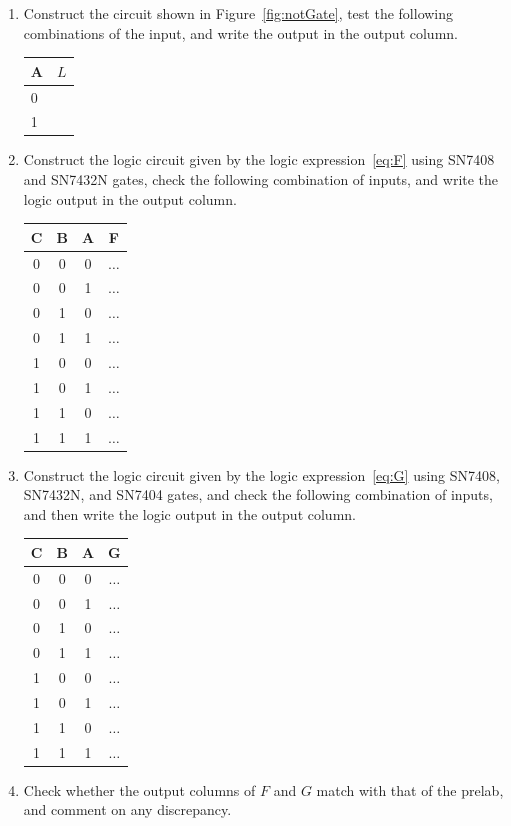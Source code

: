 \begin{enumerate}
\item Construct the circuit shown in Figure~\ref{fig:notGate}, test the following combinations of the input, and write the output in the output column.

  \begin{center}
  \begin{tabular}{l|l}
    \toprule
    A&$L$\\
    \toprule
    0 & \\
    1 & \\    
    \bottomrule
  \end{tabular}      
\end{center}


\item Construct the logic circuit given by the logic expression~\eqref{eq:F} using SN7408 and SN7432N gates, check the following combination of inputs, and write the logic output in the output column.

  \begin{center}
  \begin{tabular}{ccc|c}
    \toprule
    C & B & A & F \\
    \toprule
    0 & 0 & 0 & $\ldots$ \\
    0 & 0 & 1 & $\ldots$ \\
    0 & 1 & 0 & $\ldots$ \\
    0 & 1 & 1 & $\ldots$ \\
    1 & 0 & 0 & $\ldots$ \\
    1 & 0 & 1 & $\ldots$ \\
    1 & 1 & 0 & $\ldots$ \\
    1 & 1 & 1 & $\ldots$ \\
    \bottomrule
  \end{tabular}
\end{center}  

\item Construct the logic circuit given by the logic expression~\eqref{eq:G} using SN7408, SN7432N, and SN7404 gates, and check the following combination of inputs,  and then write the logic output in the output column. %
%
  \begin{center}
  \begin{tabular}{ccc|c}
    \toprule
    C & B & A & G \\
    \toprule
    0 & 0 & 0 & $\ldots$ \\
    0 & 0 & 1 & $\ldots$ \\
    0 & 1 & 0 & $\ldots$ \\
    0 & 1 & 1 & $\ldots$ \\
    1 & 0 & 0 & $\ldots$ \\
    1 & 0 & 1 & $\ldots$ \\
    1 & 1 & 0 & $\ldots$ \\
    1 & 1 & 1 & $\ldots$ \\
    \bottomrule
  \end{tabular}
\end{center}  

\item Check whether the output columns of  $F$ and $G$ match with that of the prelab, and comment on any discrepancy.   
\end{enumerate}

